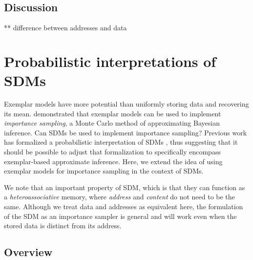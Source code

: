 \documentclass[10pt,letterpaper]{article}
\begin{document}
\subsection{Discussion}



** difference between addresses and data \\



\section{Probabilistic interpretations of SDMs}

Exemplar models have more potential than uniformly storing data and
recovering its mean.  demonstrated that exemplar models
can be used to implement \textit{importance sampling}, a Monte Carlo
method of approximating Bayesian inference.  Can SDMs be used to
implement importance sampling? Previous work has formalized a
probabilistic interpretation of SDMs \cite{Anderson1989}, thus
suggesting that it should be possible to adjust that formalization to
specifically encompass exemplar-based approximate inference. Here, we
extend the idea of using exemplar models for importance sampling in
the context of SDMs.

We note that an important property of SDM, which is that they can
function as a \textit{heteroassociative} memory, where
\textit{address} and \textit{content} do not need to be the
same. Although we treat data and addresses as equivalent here, the
formulation of the SDM as an importance sampler is general and will
work even when the stored data is distinct from its address.

\subsection{Overview}
\end{document}
